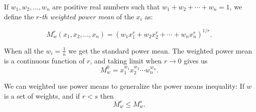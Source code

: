 \documentclass[12pt]{article}
\begin{document}
If $w_1,w_2,\ldots,w_n$ are positive real numbers such that $w_1+w_2+\cdots+w_n=1$, we define the \emph{$r$-th weighted power mean} of the $x_i$ as:

$$M_w^r(x_1,x_2,\ldots,x_n)=\left({w_1x_1^r+w_2x_2^r+\cdots+w_nx_n^r}\right)^{1/r}.$$

When all the $w_i=\frac{1}{n}$ we get the standard power mean.
The weighted power mean is a continuous function of $r$, and taking limit when $r\to0$ gives us
$$M_w^0=x_1^{w_1}x_2^{w_2}\cdots w_n^{w_n}.$$

We can weighted use power means to generalize the power means inequality:
If $w$ is a set of weights, and if $r<s$ then
$$M_w^r \leq M_w^s.$$
\end{document}
